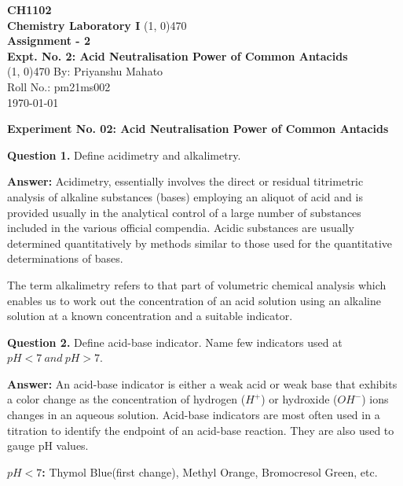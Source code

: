 \documentclass[12pt]{article}
\begin{document}
	\thispagestyle{empty}
	\begin{titlepage}
		\begin{center}
			\vspace{2cm}
			\huge\textbf{CH1102}\\
			\vspace{1cm}
			\large\textbf{Chemistry Laboratory I}
			\vfill
			\line(1, 0){470}\\[14pt]
			\huge\textbf{Assignment - 2}\\[10pt]
			\Large\textbf{Expt. No. 2: Acid Neutralisation Power of Common Antacids}\\[14pt]
			\line(1, 0){470}
			\vfill
			By: Priyanshu Mahato\\
			Roll No.: pm21ms002\\
			\today
			
		\end{center}
	\end{titlepage}
	
	\setcounter{page}{1}
	
	\large\textbf{\centering Experiment No. 02: Acid Neutralisation Power of Common Antacids}
	
	\textbf{Question 1.} Define acidimetry and alkalimetry.
	
	\textbf{Answer: } Acidimetry, essentially involves the direct or residual titrimetric analysis of alkaline substances (bases) employing an aliquot of acid and is provided usually in the analytical control of a large number of substances included in the various official compendia. Acidic substances are usually determined quantitatively by methods similar to those used for the quantitative determinations of bases.
	
	The term alkalimetry refers to that part of volumetric chemical analysis which enables us to work out the concentration of an acid solution using an alkaline solution at a known concentration and a suitable indicator.
	
	\textbf{Question 2.} Define acid-base indicator. Name few indicators used at $pH<7\ and\ pH>7$.
	
	\textbf{Answer: }An acid-base indicator is either a weak acid or weak base that exhibits a color change as the concentration of hydrogen ($H^{+}$) or hydroxide ($OH^{-}$) ions changes in an aqueous solution. Acid-base indicators are most often used in a titration to identify the endpoint of an acid-base reaction. They are also used to gauge pH values.
	
	\textbf{$pH<7$: }Thymol Blue(first change), Methyl Orange, Bromocresol Green, etc.
	
\end{document}
